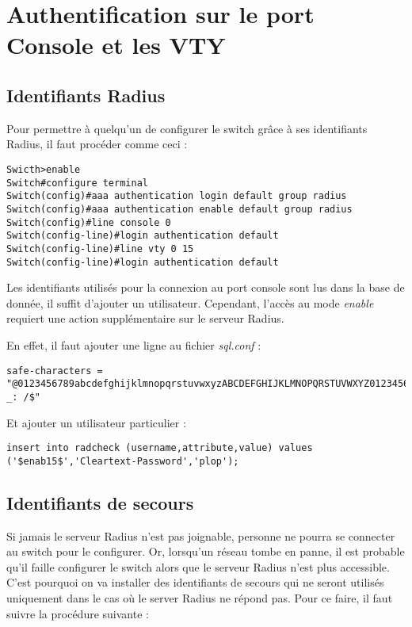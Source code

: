 \section{Authentification sur le port Console et les VTY}

\subsection{Identifiants Radius}

Pour permettre à quelqu'un de configurer le switch grâce à ses identifiants Radius, il faut procéder comme ceci :

\begin{verbatim}
Swicth>enable
Switch#configure terminal
Switch(config)#aaa authentication login default group radius
Switch(config)#aaa authentication enable default group radius
Switch(config)#line console 0
Switch(config-line)#login authentication default
Switch(config-line)#line vty 0 15
Switch(config-line)#login authentication default
\end{verbatim}

Les identifiants utilisés pour la connexion au port console sont lus dans la base de donnée, il suffit d'ajouter un utilisateur. Cependant, l'accès au mode \textit{enable} requiert une action supplémentaire sur le serveur Radius.

En effet, il faut ajouter une ligne au fichier \textit{sql.conf} :

\begin{verbatim}
safe-characters = "@0123456789abcdefghijklmnopqrstuvwxyzABCDEFGHIJKLMNOPQRSTUVWXYZ0123456789.-_: /$"
\end{verbatim}

Et ajouter un utilisateur particulier :

\begin{verbatim}
insert into radcheck (username,attribute,value) values ('$enab15$','Cleartext-Password','plop');
\end{verbatim}

\subsection{Identifiants de secours}

Si jamais le serveur Radius n'est pas joignable, personne ne pourra se connecter au switch pour le configurer. Or, lorsqu'un réseau tombe en panne, il est probable qu'il faille configurer le switch alors que le serveur Radius n'est plus accessible. C'est pourquoi on va installer des identifiants de secours qui ne seront utilisés uniquement dans le cas où le server Radius ne répond pas. Pour ce faire, il faut suivre la procédure suivante :

